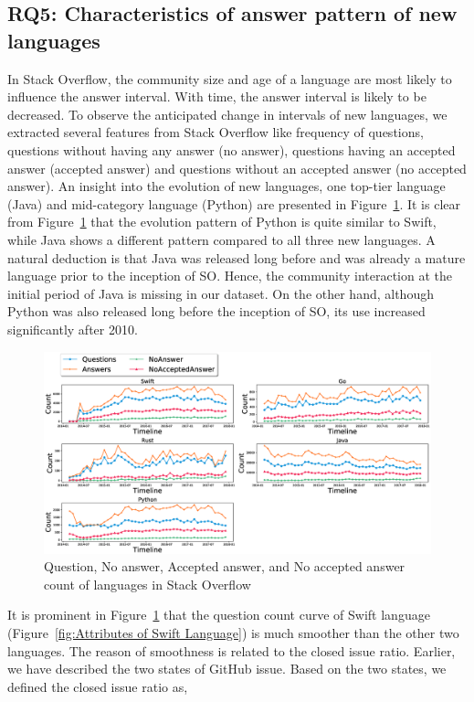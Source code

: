 \subsection{RQ5: Characteristics of answer pattern of new languages}
\label{RQ4}
In Stack Overflow, the community size and age of a language are most likely to influence the answer interval. With time, the answer interval is likely to be decreased. To observe the anticipated change in intervals of new languages, we extracted several features from Stack Overflow like frequency of questions, questions without having any answer (no answer), questions having an accepted answer (accepted answer) and questions without an accepted answer (no accepted answer). An insight into the evolution of new languages, one top-tier language (Java) and mid-category language (Python)
are presented in Figure~\ref{fig:Evolution of new languages}. It is clear from Figure~\ref{fig:Evolution of new languages} that the evolution pattern of Python is quite similar to Swift, while Java shows a different pattern compared to all three new languages. A natural deduction is  that Java was released long before and was already a mature language prior to the inception of SO.  Hence, the community interaction at the initial period of Java is missing in our dataset. On the other hand, although Python was also released long before the inception of SO, its  use increased significantly after 2010\citep{TIOBE:index}.

\begin{figure}[htbp]

\includegraphics[scale=0.28]{figures/Evolution.eps} 
\caption{Question, No answer, Accepted answer, and No accepted answer count of languages in Stack Overflow}
\label{fig:Evolution of new languages}
\end{figure}

\iffalse
It is prominent in Figure~\ref{fig:Evolution of new languages} that the question count curve of Swift language (Figure~\ref{fig:Attributes of Swift Language}) is much smoother than the other two languages. The reason of smoothness is related to the closed issue ratio. Earlier, we have described the two states of GitHub issue. Based on the two states, we defined the closed issue ratio as,

